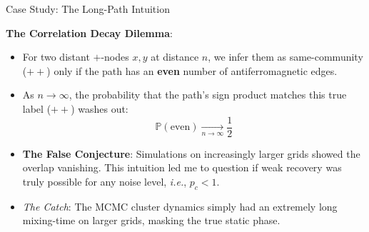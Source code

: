 \documentclass[A4,svgnames,9pt,aspectratio=169]{beamer}
\begin{document}
\begin{frame}{Case Study: The Long-Path Intuition}
    \begin{center}
    \end{center}
    \textbf{The Correlation Decay Dilemma}:
    \begin{itemize}
        \setlength{\itemsep}{6pt}
        \item For two distant $+$-nodes $x, y$ at distance $n$, we infer them as same-community ($+ +$) only if the path has an \textbf{even} number of antiferromagnetic edges.
        \item As $n \to \infty$, the probability that the path's sign product matches this true label ($+ +$) washes out:
        \[ \mathbb{P}(\text{even}) \xrightarrow[n \to \infty]{} \frac{1}{2} \]
        \item \textbf{The False Conjecture}: Simulations on increasingly larger grids showed the overlap vanishing. This intuition led me to question if weak recovery was truly possible for any noise level, \emph{i.e.}, $p_c < 1$.
        \item \emph{The Catch}: The MCMC cluster dynamics simply had an extremely long mixing-time on larger grids, masking the true static phase.
    \end{itemize}
\end{frame}
\end{document}
